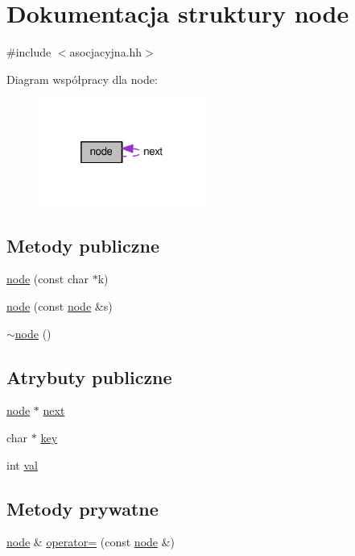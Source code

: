 \hypertarget{structnode}{\section{Dokumentacja struktury node}
\label{structnode}
}


{\ttfamily \#include $<$asocjacyjna.\-hh$>$}



Diagram współpracy dla node\-:
\nopagebreak
\begin{figure}[H]
\begin{center}
\leavevmode
\includegraphics[width=157pt]{structnode__coll__graph}
\end{center}
\end{figure}
\subsection*{Metody publiczne}
\begin{DoxyCompactItemize}
\item 
\hyperlink{structnode_aa35dea72944f465a6ed9081f80cf4d3c}{node} (const char $\ast$k)
\item 
\hyperlink{structnode_a20955f1a00c88a0b6bb4b7cee24fe6ee}{node} (const \hyperlink{structnode}{node} \&s)
\item 
\hyperlink{structnode_a482f83436a89f09d289b26144d817adf}{$\sim$node} ()
\end{DoxyCompactItemize}
\subsection*{Atrybuty publiczne}
\begin{DoxyCompactItemize}
\item 
\hyperlink{structnode}{node} $\ast$ \hyperlink{structnode_aad210fa7c160a49f6b9a3ffee592a2bc}{next}
\item 
char $\ast$ \hyperlink{structnode_a69c02a14f8fdbc19c86fcd22854a4bda}{key}
\item 
int \hyperlink{structnode_a707bf3f1eeeaf8974e7e8e90f7bfd6a1}{val}
\end{DoxyCompactItemize}
\subsection*{Metody prywatne}
\begin{DoxyCompactItemize}
\item 
\hyperlink{structnode}{node} \& \hyperlink{structnode_a80a823f207faf2a4208f711d36ded07d}{operator=} (const \hyperlink{structnode}{node} \&)
\end{DoxyCompactItemize}


